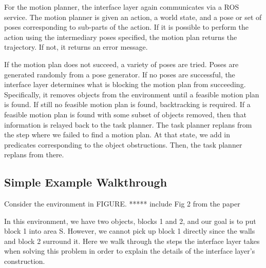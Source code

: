 \documentclass[12pt]{article}
\begin{document}
For the motion planner, the interface layer again communicates via a ROS service.  
The motion planner is given an action, a world state, and a pose or set of poses corresponding to sub-parts of the action.  
If it is possible to perform the action using the intermediary poses specified, the motion plan returns the trajectory.  
If not, it returns an error message.

If the motion plan does not succeed, a variety of poses are tried.  
Poses are generated randomly from a pose generator.  
If no poses are successful, the interface layer determines what is blocking the motion plan from succeeding.  
Specifically, it removes objects from the environment until a feasible motion plan is found.  
If still no feasible motion plan is found, backtracking is required.  
If a feasible motion plan is found with some subset of objects removed, then that information is relayed back to the task planner.  
The task planner replans from the step where we failed to find a motion plan.  
At that state, we add in predicates corresponding to the object obstructions.  
Then, the task planner replans from there.  


\subsection{Simple Example Walkthrough}

Consider the environment in FIGURE.  ***** include Fig 2 from the paper

In this environment, we have two objects, blocks 1 and 2, and our goal is to put block 1 into area S.  
However, we cannot pick up block 1 directly since the walls and block 2 surround it.  
Here we walk through the steps the interface layer takes when solving this problem in order to explain the details of the interface layer's construction.
\end{document}
